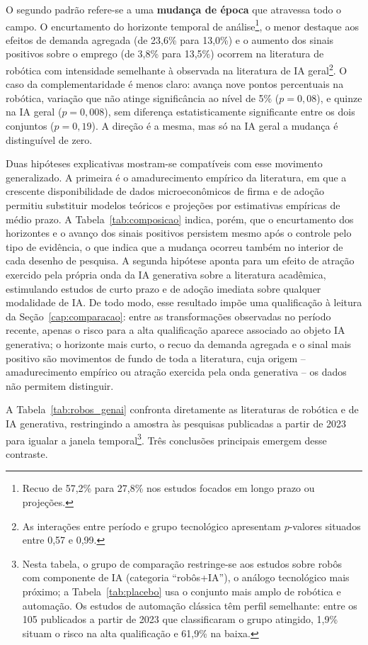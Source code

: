 O segundo padrão refere-se a uma \textbf{mudança de época} que atravessa todo o campo. O encurtamento do horizonte temporal de análise\footnote{Recuo de 57,2\% para 27,8\% nos estudos focados em longo prazo ou projeções.}, o menor destaque aos efeitos de demanda agregada (de 23,6\% para 13,0\%) e o aumento dos sinais positivos sobre o emprego (de 3,8\% para 13,5\%) ocorrem na literatura de robótica com intensidade semelhante à observada na literatura de IA geral\footnote{As interações entre período e grupo tecnológico apresentam $p$-valores situados entre 0,57 e 0,99.}. O caso da complementaridade é menos claro: avança nove pontos percentuais na robótica, variação que não atinge significância ao nível de 5\% ($p = 0{,}08$), e quinze na IA geral ($p = 0{,}008$), sem diferença estatisticamente significante entre os dois conjuntos ($p = 0{,}19$). A direção é a mesma, mas só na IA geral a mudança é distinguível de zero.


Duas hipóteses explicativas mostram-se compatíveis com esse movimento generalizado. A primeira é o amadurecimento empírico da literatura, em que a crescente disponibilidade de dados microeconômicos de firma e de adoção permitiu substituir modelos teóricos e projeções por estimativas empíricas de médio prazo. A Tabela~\ref{tab:composicao} indica, porém, que o encurtamento dos horizontes e o avanço dos sinais positivos persistem mesmo após o controle pelo tipo de evidência, o que indica que a mudança ocorreu também no interior de cada desenho de pesquisa. A segunda hipótese aponta para um efeito de atração exercido pela própria onda da IA generativa sobre a literatura acadêmica, estimulando estudos de curto prazo e de adoção imediata sobre qualquer modalidade de IA. De todo modo, esse resultado impõe uma qualificação à leitura da Seção~\ref{cap:comparacao}: entre as transformações observadas no período recente, apenas o risco para a alta qualificação aparece associado ao objeto IA generativa; o horizonte mais curto, o recuo da demanda agregada e o sinal mais positivo são movimentos de fundo de toda a literatura, cuja origem -- amadurecimento empírico ou atração exercida pela onda generativa -- os dados não permitem distinguir.

\begin{table}[htbp]
\centering
\caption{Literatura de robótica vs.\ literatura de IA generativa (publicados de 2023 em diante).}
\label{tab:robos_genai}
{\small}
\end{table}

A Tabela~\ref{tab:robos_genai} confronta diretamente as literaturas de robótica e de IA generativa, restringindo a amostra às pesquisas publicadas a partir de 2023 para igualar a janela temporal\footnote{Nesta tabela, o grupo de comparação restringe-se aos estudos sobre robôs com componente de IA (categoria ``robôs+IA''), o análogo tecnológico mais próximo; a Tabela~\ref{tab:placebo} usa o conjunto mais amplo de robótica e automação. Os estudos de automação clássica têm perfil semelhante: entre os 105 publicados a partir de 2023 que classificaram o grupo atingido, 1,9\% situam o risco na alta qualificação e 61,9\% na baixa.}. Três conclusões principais emergem desse contraste. 

